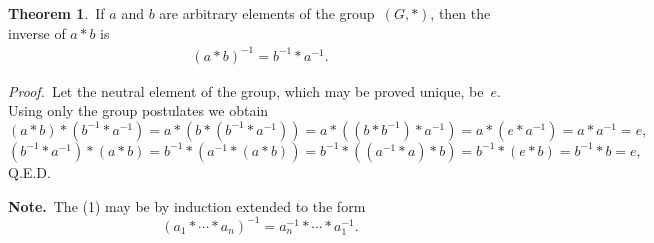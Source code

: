 \documentclass[12pt]{article}
\theoremstyle{definition}
\newtheorem*{thmplain}{Theorem}
\begin{document}
\begin{thmplain}
 \,If $a$ and $b$ are arbitrary elements of the group \,$(G,*)$, then the inverse of $a*b$ is 
\begin{align}  
      (a*b)^{-1} = b^{-1}*a^{-1}.
\end{align}
\end{thmplain}

{\em Proof.}\, Let the neutral element of the group, which may be proved unique, be\, $e$.\, Using only the group postulates we obtain
   $$(a*b)*(b^{-1}*a^{-1}) = a*(b*(b^{-1}*a^{-1})) = 
a*((b*b^{-1})*a^{-1}) = a*(e*a^{-1}) = a*a^{-1} = e,$$
   $$(b^{-1}*a^{-1})*(a*b) = b^{-1}*(a^{-1}*(a*b)) = b^{-1}*((a^{-1}*a)*b) = 
b^{-1}*(e*b) = b^{-1}*b = e,$$
Q.E.D.

\textbf{Note.}\, The  (1) may be by induction extended to the form
$$(a_1*\cdots*a_n)^{-1} = a_n^{-1}*\cdots*a_1^{-1}.$$
\end{document}
